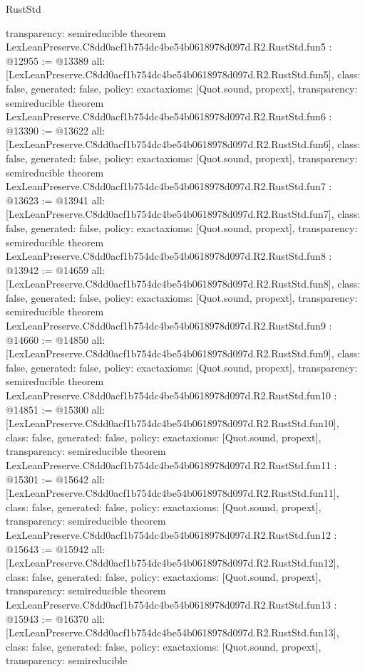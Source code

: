 \begin{lexlean}{RustStd}
\begin{coremodule}
{  transparency: semireducible
}
theorem LexLeanPreserve.C8dd0acf1b754dc4be54b0618978d097d.R2.RustStd.fun5 : @12955 := @13389 {
  all: [LexLeanPreserve.C8dd0acf1b754dc4be54b0618978d097d.R2.RustStd.fun5],
  class: false,
  generated: false,
  policy: exact{axioms: [Quot.sound, propext]},
  transparency: semireducible
}
theorem LexLeanPreserve.C8dd0acf1b754dc4be54b0618978d097d.R2.RustStd.fun6 : @13390 := @13622 {
  all: [LexLeanPreserve.C8dd0acf1b754dc4be54b0618978d097d.R2.RustStd.fun6],
  class: false,
  generated: false,
  policy: exact{axioms: [Quot.sound, propext]},
  transparency: semireducible
}
theorem LexLeanPreserve.C8dd0acf1b754dc4be54b0618978d097d.R2.RustStd.fun7 : @13623 := @13941 {
  all: [LexLeanPreserve.C8dd0acf1b754dc4be54b0618978d097d.R2.RustStd.fun7],
  class: false,
  generated: false,
  policy: exact{axioms: [Quot.sound, propext]},
  transparency: semireducible
}
theorem LexLeanPreserve.C8dd0acf1b754dc4be54b0618978d097d.R2.RustStd.fun8 : @13942 := @14659 {
  all: [LexLeanPreserve.C8dd0acf1b754dc4be54b0618978d097d.R2.RustStd.fun8],
  class: false,
  generated: false,
  policy: exact{axioms: [Quot.sound, propext]},
  transparency: semireducible
}
theorem LexLeanPreserve.C8dd0acf1b754dc4be54b0618978d097d.R2.RustStd.fun9 : @14660 := @14850 {
  all: [LexLeanPreserve.C8dd0acf1b754dc4be54b0618978d097d.R2.RustStd.fun9],
  class: false,
  generated: false,
  policy: exact{axioms: [Quot.sound, propext]},
  transparency: semireducible
}
theorem LexLeanPreserve.C8dd0acf1b754dc4be54b0618978d097d.R2.RustStd.fun10 : @14851 := @15300 {
  all: [LexLeanPreserve.C8dd0acf1b754dc4be54b0618978d097d.R2.RustStd.fun10],
  class: false,
  generated: false,
  policy: exact{axioms: [Quot.sound, propext]},
  transparency: semireducible
}
theorem LexLeanPreserve.C8dd0acf1b754dc4be54b0618978d097d.R2.RustStd.fun11 : @15301 := @15642 {
  all: [LexLeanPreserve.C8dd0acf1b754dc4be54b0618978d097d.R2.RustStd.fun11],
  class: false,
  generated: false,
  policy: exact{axioms: [Quot.sound, propext]},
  transparency: semireducible
}
theorem LexLeanPreserve.C8dd0acf1b754dc4be54b0618978d097d.R2.RustStd.fun12 : @15643 := @15942 {
  all: [LexLeanPreserve.C8dd0acf1b754dc4be54b0618978d097d.R2.RustStd.fun12],
  class: false,
  generated: false,
  policy: exact{axioms: [Quot.sound, propext]},
  transparency: semireducible
}
theorem LexLeanPreserve.C8dd0acf1b754dc4be54b0618978d097d.R2.RustStd.fun13 : @15943 := @16370 {
  all: [LexLeanPreserve.C8dd0acf1b754dc4be54b0618978d097d.R2.RustStd.fun13],
  class: false,
  generated: false,
  policy: exact{axioms: [Quot.sound, propext]},
  transparency: semireducible
}
\end{coremodule}
\end{lexlean}
